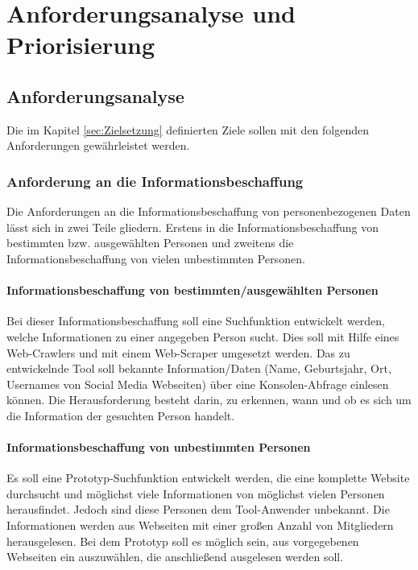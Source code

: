 
\chapter{Anforderungsanalyse und Priorisierung}  %
\label{cha:Anforderungsanalyse und Prioriesierung} %
\section{Anforderungsanalyse} %
\label{sec:Anforderunsanalyse} %
Die im Kapitel \ref{sec:Zielsetzung} definierten Ziele sollen mit den folgenden Anforderungen gewährleistet werden.

	\subsection{Anforderung an die Informationsbeschaffung}
	Die Anforderungen an die Informationsbeschaffung von personenbezogenen Daten lässt sich in zwei Teile gliedern. Erstens in die Informationsbeschaffung von bestimmten bzw. ausgewählten Personen und zweitens die Informationsbeschaffung von vielen unbestimmten Personen.
	
		\subsubsection{Informationsbeschaffung von bestimmten/ausgewählten Personen}
		Bei dieser Informationsbeschaffung soll eine Suchfunktion entwickelt werden, welche Informationen zu einer angegeben Person sucht. Dies soll mit Hilfe eines Web-Crawlers und mit einem Web-Scraper umgesetzt werden. Das zu entwickelnde Tool soll bekannte Information/Daten (Name, Geburtsjahr, Ort, Usernames von Social Media Webseiten) über eine Konsolen-Abfrage einlesen können. Die Herausforderung besteht darin, zu erkennen, wann und ob es sich um die Information der gesuchten Person handelt.
	
		\subsubsection{Informationsbeschaffung von unbestimmten Personen}
		Es soll eine Prototyp-Suchfunktion entwickelt werden, die eine komplette Website durchsucht und möglichst viele Informationen von möglichst vielen Personen herausfindet. Jedoch sind diese Personen dem Tool-Anwender unbekannt. Die Informationen werden aus Webseiten mit einer großen Anzahl von Mitgliedern herausgelesen. Bei dem Prototyp soll es möglich sein, aus vorgegebenen Webseiten ein auszuwählen, die anschließend ausgelesen werden soll.
		
